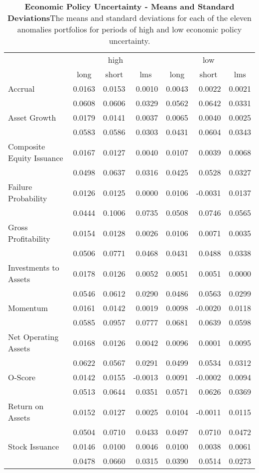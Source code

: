 \begin{table}[htbp]
\centering
\scriptsize
\caption[EPU - Means and Standard Deviations]{\textbf{Economic Policy Uncertainty - Means and Standard Deviations}\newline The means and standard deviations for each of the eleven anomalies portfolios for periods of high and low economic policy uncertainty.}
\label{tab:epu-stats}
\begin{tabular}{@{}lrrrrrr@{}}
\toprule
& \multicolumn{3}{c}{high} & \multicolumn{3}{c}{low} \\ \cmidrule(l){2-7} 
& \multicolumn{1}{c}{long} & \multicolumn{1}{c}{short} & \multicolumn{1}{c}{lms} & \multicolumn{1}{c}{long} & \multicolumn{1}{c}{short} & \multicolumn{1}{c}{lms} \\ \midrule
Accrual & 0.0163 & 0.0153 & 0.0010 & 0.0043 & 0.0022 & 0.0021 \\
& 0.0608 & 0.0606 & 0.0329 & 0.0562 & 0.0642 & 0.0331 \\
Asset Growth & 0.0179 & 0.0141 & 0.0037 & 0.0065 & 0.0040 & 0.0025 \\
& 0.0583 & 0.0586 & 0.0303 & 0.0431 & 0.0604 & 0.0343 \\
Composite Equity Issuance & 0.0167 & 0.0127 & 0.0040 & 0.0107 & 0.0039 & 0.0068 \\
& 0.0498 & 0.0637 & 0.0316 & 0.0425 & 0.0528 & 0.0327 \\
Failure Probability & 0.0126 & 0.0125 & 0.0000 & 0.0106 & -0.0031 & 0.0137 \\
& 0.0444 & 0.1006 & 0.0735 & 0.0508 & 0.0746 & 0.0565 \\
Gross Profitability & 0.0154 & 0.0128 & 0.0026 & 0.0106 & 0.0071 & 0.0035 \\
& 0.0506 & 0.0771 & 0.0468 & 0.0431 & 0.0488 & 0.0338 \\
Investments to Assets & 0.0178 & 0.0126 & 0.0052 & 0.0051 & 0.0051 & 0.0000 \\
& 0.0546 & 0.0612 & 0.0290 & 0.0486 & 0.0563 & 0.0299 \\
Momentum & 0.0161 & 0.0142 & 0.0019 & 0.0098 & -0.0020 & 0.0118 \\
& 0.0585 & 0.0957 & 0.0777 & 0.0681 & 0.0639 & 0.0598 \\
Net Operating Assets & 0.0168 & 0.0126 & 0.0042 & 0.0096 & 0.0001 & 0.0095 \\
& 0.0622 & 0.0567 & 0.0291 & 0.0499 & 0.0534 & 0.0312 \\
O-Score & 0.0142 & 0.0155 & -0.0013 & 0.0091 & -0.0002 & 0.0094 \\
& 0.0513 & 0.0644 & 0.0351 & 0.0571 & 0.0626 & 0.0369 \\
Return on Assets & 0.0152 & 0.0127 & 0.0025 & 0.0104 & -0.0011 & 0.0115 \\
& 0.0504 & 0.0710 & 0.0433 & 0.0497 & 0.0710 & 0.0472 \\
Stock Issuance & 0.0146 & 0.0100 & 0.0046 & 0.0100 & 0.0038 & 0.0061 \\
& 0.0478 & 0.0660 & 0.0315 & 0.0390 & 0.0514 & 0.0273 \\ \bottomrule
\end{tabular}%
\end{table}